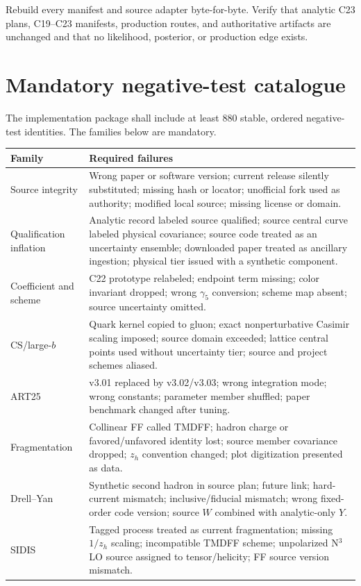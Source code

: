 \documentclass[11pt]{article}
\newcommand{\CS}{\ensuremath{\mathrm{CS}}}
\begin{document}
Rebuild every manifest and source adapter byte-for-byte.  Verify that analytic C23 plans, C19--C23 manifests, production routes, and authoritative artifacts are unchanged and that no likelihood, posterior, or production edge exists.

\section{Mandatory negative-test catalogue}
\label{sec:negative-tests}

The implementation package shall include at least 880 stable, ordered negative-test identities.  The families below are mandatory.

\begin{longtable}{L{0.27\textwidth}L{0.65\textwidth}}
\toprule
Family & Required failures\\
\midrule
\endhead
Source integrity & Wrong paper or software version; current release silently substituted; missing hash or locator; unofficial fork used as authority; modified local source; missing license or domain.\\
Qualification inflation & Analytic record labeled source qualified; source central curve labeled physical covariance; source code treated as an uncertainty ensemble; downloaded paper treated as ancillary ingestion; physical tier issued with a synthetic component.\\
Coefficient and scheme & C22 prototype relabeled; endpoint term missing; color invariant dropped; wrong \(\gamma_5\) conversion; scheme map absent; source uncertainty omitted.\\
\CS/large-\(b\) & Quark kernel copied to gluon; exact nonperturbative Casimir scaling imposed; source domain exceeded; lattice central points used without uncertainty tier; source and project schemes aliased.\\
ART25 & v3.01 replaced by v3.02/v3.03; wrong integration mode; wrong constants; parameter member shuffled; paper benchmark changed after tuning.\\
Fragmentation & Collinear FF called TMDFF; hadron charge or favored/unfavored identity lost; source member covariance dropped; \(z_h\) convention changed; plot digitization presented as data.\\
Drell--Yan & Synthetic second hadron in source plan; future link; hard-current mismatch; inclusive/fiducial mismatch; wrong fixed-order code version; source \(W\) combined with analytic-only \(Y\).\\
SIDIS & Tagged process treated as current fragmentation; missing \(1/z_h\) scaling; incompatible TMDFF scheme; unpolarized N\(^3\)LO source assigned to tensor/helicity; FF source version mismatch.\\

\end{longtable}
\end{document}
